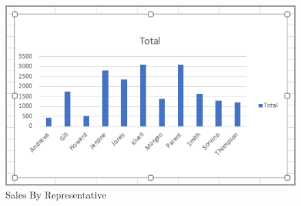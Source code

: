 \begin{figure}[H]
	\centering
	\includegraphics[width=\maxwidth{.95\linewidth}]{gfx/ch07_fig28}
	\caption{Sales By Representative}
	\label{07:fig28}
\end{figure}

